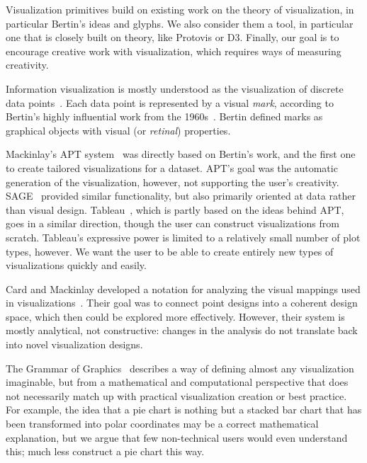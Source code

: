 \label{relatedWork}
Visualization primitives build on existing work on the theory of visualization, in particular Bertin's ideas and glyphs. We also consider them a tool, in particular one that is closely built on theory, like Protovis or D3. Finally, our goal is to encourage creative work with visualization, which requires ways of measuring creativity.

\label{theory}

Information visualization is mostly understood as the visualization of discrete data points~\cite{tory2004rethinking}.
Each data point is represented by a visual \textit{mark}, according to Bertin's highly influential work from the 1960s~\cite{bertin1983semiology}.
Bertin defined marks as graphical objects with visual (or \textit{retinal}) properties.

Mackinlay's APT system~\cite{Mackinlay1986} was directly based on Bertin's work, and the first one to create tailored visualizations for a dataset.
APT's goal was the automatic generation of the visualization, however, not supporting the user's creativity.
SAGE~\cite{Roth:CHI:1994} provided similar functionality, but also primarily oriented at data rather than visual design.
Tableau~\cite{stolte2002polaris}, which is partly based on the ideas behind APT, goes in a similar direction, though the user can construct visualizations from scratch.
Tableau's expressive power is  limited to a relatively small number of plot types, however.
We want the user to be able to create entirely new types of visualizations quickly and easily.

Card and Mackinlay developed a notation for analyzing the visual mappings used in visualizations~\cite{Card1997}.
Their goal was to connect point designs into a coherent design space, which then could be explored more effectively.
However, their system is mostly analytical, not constructive: changes in the analysis do not translate back into novel visualization designs.

The Grammar of Graphics~\cite{Wickham:JCGS:2010,Wilkinson2005c} describes a way of defining almost any visualization imaginable, but from a mathematical and computational perspective that does not necessarily match up with practical visualization creation or best practice.
For example, the idea that a pie chart is nothing but a stacked bar chart that has been transformed into polar coordinates may be a correct mathematical explanation, but we argue that few non-technical users would even understand this; much less construct a pie chart this way.

